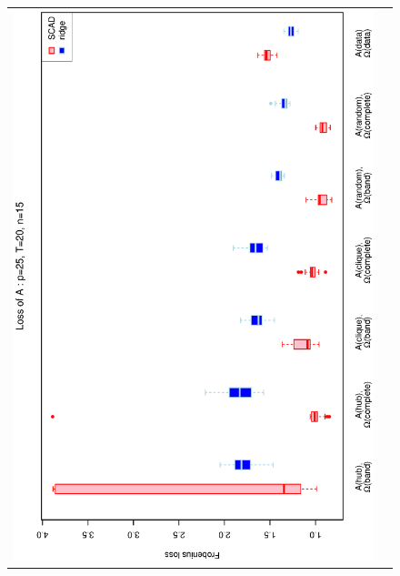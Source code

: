 \documentclass[a4paper]{article}
\begin{document}
\begin{figure}[h!]
\centering
\begin{tabular}{cc}
\includegraphics[scale=0.45,angle=270]{LossA25T20N15_25.eps}
\\

\end{tabular}
\end{figure}
\end{document}
